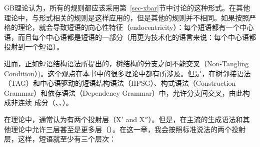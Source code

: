 GB理论认为，所有的规则都应该采用第~\ref{sec-xbar}节中讨论的\xbar 这种形式。在其他理论中，与\xbar 形式相关的规则是这样应用的，但是其他的规则并不相同。如果按照严格的\xbar 理论，就会导致短语的向心性特征（endocentricity）：每个短语都有一个中心语，而且每个中心语都是短语的一部分（用更为技术化的语言来说：每个中心语都投射到一个短语）。

进而，正如短语结构语法所提出的，树结构的分支之间不能交叉（Non-Tangling Condition）)。这个观点在本书中的很多理论中都有所涉及。但是，在树邻接语法\indextag（TAG）和中心语驱动的短语结构语法\indexhpsg（HPSG）、构式语法\indexcxg（Construction Grammar）和依存语法\indexdg （Dependency Grammar）中，允许分支间交叉，由此构成非连续 成分（\citealp*{BJR91a,Reape94a,BC2005a}、\citealp[]{Heringer96a-u}、\citealp[Section~9.6.2]{Eroms2000a}）。

在\xbar 理论中，通常认为有两个投射层（X$'$ and X$''$）。但是，在主流的生成语法和其他理论中允许三层甚至是更多层（）。在这一章，我会按照标准说法的两个投射层，这样，短语就至少有三个层次：

